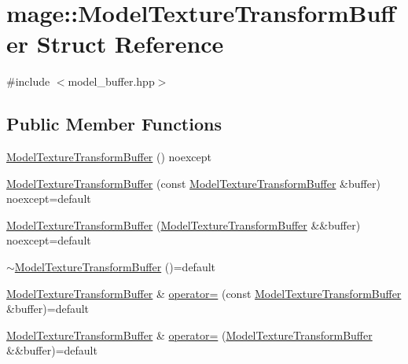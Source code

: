 \hypertarget{structmage_1_1_model_texture_transform_buffer}{}\section{mage\+:\+:Model\+Texture\+Transform\+Buffer Struct Reference}
\label{structmage_1_1_model_texture_transform_buffer}


{\ttfamily \#include $<$model\+\_\+buffer.\+hpp$>$}

\subsection*{Public Member Functions}
\begin{DoxyCompactItemize}
\item 
\hyperlink{structmage_1_1_model_texture_transform_buffer_a8db3a9beb1605af8eaf86e76ae909b6b}{Model\+Texture\+Transform\+Buffer} () noexcept
\item 
\hyperlink{structmage_1_1_model_texture_transform_buffer_a8343debdebb3d3c3df8c82ee5c3d88ab}{Model\+Texture\+Transform\+Buffer} (const \hyperlink{structmage_1_1_model_texture_transform_buffer}{Model\+Texture\+Transform\+Buffer} \&buffer) noexcept=default
\item 
\hyperlink{structmage_1_1_model_texture_transform_buffer_a90eaca1a29930ec51a3cd50bee212f57}{Model\+Texture\+Transform\+Buffer} (\hyperlink{structmage_1_1_model_texture_transform_buffer}{Model\+Texture\+Transform\+Buffer} \&\&buffer) noexcept=default
\item 
\hyperlink{structmage_1_1_model_texture_transform_buffer_a855c8ccaefe9bac3fd10cdc143616cd9}{$\sim$\+Model\+Texture\+Transform\+Buffer} ()=default
\item 
\hyperlink{structmage_1_1_model_texture_transform_buffer}{Model\+Texture\+Transform\+Buffer} \& \hyperlink{structmage_1_1_model_texture_transform_buffer_a4fd72713afb7e68208c0356a2b55f3d9}{operator=} (const \hyperlink{structmage_1_1_model_texture_transform_buffer}{Model\+Texture\+Transform\+Buffer} \&buffer)=default
\item 
\hyperlink{structmage_1_1_model_texture_transform_buffer}{Model\+Texture\+Transform\+Buffer} \& \hyperlink{structmage_1_1_model_texture_transform_buffer_a025ad62973c7ae20b8e977f94c509a54}{operator=} (\hyperlink{structmage_1_1_model_texture_transform_buffer}{Model\+Texture\+Transform\+Buffer} \&\&buffer)=default
\end{DoxyCompactItemize}

